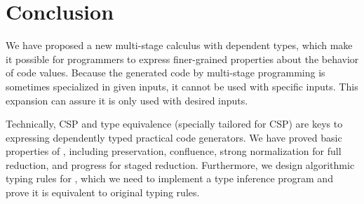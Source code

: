 
\section{Conclusion \label{sec:conclusion}}


We have proposed a new multi-stage calculus \LMD with dependent types, which make it possible for programmers to express finer-grained properties about the behavior of code values. Because the generated code by multi-stage programming is sometimes specialized in given inputs, it cannot be used with specific inputs. This expansion can assure it is only used with desired inputs.


Technically, CSP and type equivalence (specially tailored for CSP) are keys to expressing dependently typed practical code generators.  We have proved basic properties of \LMD, including preservation, confluence, strong normalization for full reduction, and progress for staged reduction. Furthermore, we design algorithmic typing rules for \LMD, which we need to implement a type inference program and prove it is equivalent to original typing rules.



